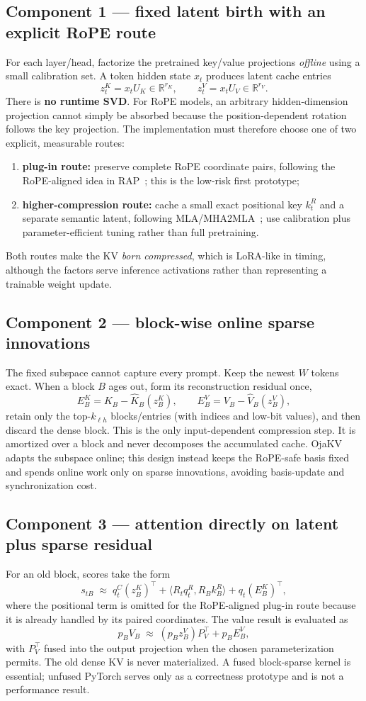 \documentclass[11pt]{article}
\newcommand{\term}[1]{\textbf{\color{accent!85!black}#1}}
\newcommand{\R}{\mathbb{R}}
\begin{document}
\subsection{Component 1 --- fixed latent birth with an explicit RoPE route}
For each layer/head, factorize the pretrained key/value projections \emph{offline} using a
small calibration set. A token hidden state $x_t$ produces latent cache entries
\[
z_t^K=x_tU_K\in\R^{r_K},\qquad z_t^V=x_tU_V\in\R^{r_V}.
\]
There is \term{no runtime SVD}. For RoPE models, an arbitrary hidden-dimension projection
cannot simply be absorbed because the position-dependent rotation follows the key projection.
The implementation must therefore choose one of two explicit, measurable routes:
\begin{enumerate}[leftmargin=1.5em,itemsep=1pt]
\item \term{plug-in route:} preserve complete RoPE coordinate pairs, following the
RoPE-aligned idea in RAP~\cite{rap}; this is the low-risk first prototype;
\item \term{higher-compression route:} cache a small exact positional key $k_t^R$ and a
separate semantic latent, following MLA/MHA2MLA~\cite{deepseekv2,mha2mla}; use calibration
plus parameter-efficient tuning rather than full pretraining.
\end{enumerate}
Both routes make the KV \emph{born compressed}, which is LoRA-like in timing, although the
factors serve inference activations rather than representing a trainable weight update.

\subsection{Component 2 --- block-wise online sparse innovations}
The fixed subspace cannot capture every prompt. Keep the newest $W$ tokens exact. When a block
$B$ ages out, form its reconstruction residual once,
\[
E_B^K=K_B-\hat K_B(z_B^K),\qquad E_B^V=V_B-\hat V_B(z_B^V),
\]
retain only the top-$k_{\ell h}$ blocks/entries (with indices and low-bit values), and then
discard the dense block. This is the only input-dependent compression step. It is amortized
over a block and never decomposes the accumulated cache. OjaKV~\cite{ojakv} adapts the
subspace online; this design instead keeps the RoPE-safe basis fixed and spends online work
only on sparse innovations, avoiding basis-update and synchronization cost.

\subsection{Component 3 --- attention directly on latent plus sparse residual}
For an old block, scores take the form
\[
s_{tB}\;\approx\; q_t^C(z_B^K)^\top
  + \langle R_tq_t^R, R_Bk_B^R\rangle
  + q_t(E_B^K)^\top ,
\]
where the positional term is omitted for the RoPE-aligned plug-in route because it is already
handled by its paired coordinates. The value result is evaluated as
\[
p_BV_B\;\approx\;(p_Bz_B^V)P_V^\top+p_BE_B^V,
\]
with $P_V^\top$ fused into the output projection when the chosen parameterization permits.
The old dense KV is never materialized. A fused block-sparse kernel is essential; unfused
PyTorch serves only as a correctness prototype and is not a performance result.
\end{document}
